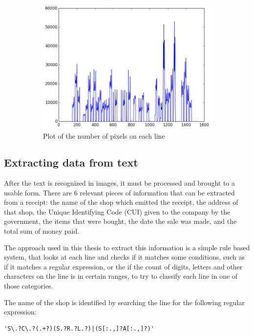 \begin{figure}
\ContinuedFloat
\centering
\begin{subfigure}{\linewidth}
  \centering
  \includegraphics[width=\linewidth]{img/lines.png}
  \caption{Plot of the number of pixels on each line}
  \label{fig:line_plot}
\end{subfigure}
\caption{\label{fig:plots2} }
\end{figure}

\subsection{Extracting data from text}
After the text is recognized in images, it must be processed and brought to a usable form. There are 6 relevant pieces of information that can be extracted from a receipt: the name of the shop which emitted the receipt, the address of that shop, the Unique Identifying Code (CUI) given to the company by the government, the items that were bought, the date the sale was made, and the total sum of money paid. 

The approach used in this thesis to extract this information is a simple rule based system, that looks at each line and checks if it matches some conditions, such as if it matches a regular expression, or the if the count of digits, letters and other characters on the line is in certain ranges, to try to classify each line in one of those categories. 

The name of the shop is identified by searching the line for the following regular expression: 

\begin{lstlisting}
'S\.?C\.?(.+?)(S.?R.?L.?)|(S[:.,]?A[:.,]?)'
\end{lstlisting}

